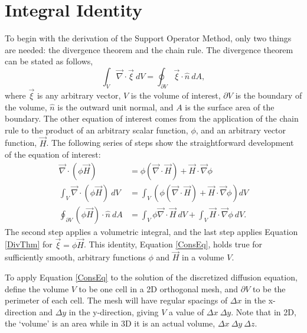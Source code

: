 \documentclass[11pt,letterpaper,oneside,notitlepage]{article}	%
\newcommand{\del}{\vec\nabla}				%
\newcommand{\eq}[1]{Equation \eqref{#1}}		%
\newcommand{\pindent}[1]{\hspace{6mm}}  		%
\numberwithin{equation}{section}				%
\begin{document}
\section{Integral Identity}%
\pindent{}To begin with the derivation of the Support Operator Method, only two things are needed: the divergence theorem and the chain rule.  The divergence theorem can be stated as follows,
\begin{equation}
\int_V \del\cdot\vec\xi\ dV = \oint_{\partial V} \vec \xi \cdot \hat n\ dA \label{DivThm},
\end{equation}
where $\vec \xi$ is any arbitrary vector, $V$ is the volume of interest, $\partial V$ is the boundary of the volume, $\hat n$ is the outward unit normal, and $A$ is the surface area of the boundary.  The other equation of interest comes from the application of the chain rule to the product of an arbitrary scalar function, $\phi$, and an arbitrary vector function, $\vec H$.  The following series of steps show the straightforward development of the equation of interest:
\begin{align}
\del\cdot(\phi\vec H) &= \phi(\del\cdot\vec H) + \vec H\cdot\del\phi \\
\int_V\del\cdot(\phi\vec H)\ dV &= \int_V\left(\phi(\del\cdot\vec H) + \vec H\cdot\del\phi\right)dV \\
\oint_{\partial V}(\phi\vec H)\cdot\hat n\ dA &= \int_V\phi\del\cdot\vec H\ dV + \int_V\vec H\cdot\del\phi\ dV \label{ConsEq}.
\end{align}
The second step applies a volumetric integral, and the last step applies \eq{DivThm} for $\vec\xi=\phi\vec H$.  This identity, \eq{ConsEq}, holds true for sufficiently smooth, arbitrary functions $\phi$ and $\vec H$ in a volume $V$\cite{Runnels2006}.

To apply \eq{ConsEq} to the solution of the discretized diffusion equation, define the volume $V$ to be one cell in a 2D orthogonal mesh, and $\partial V$ to be the perimeter of each cell.  The mesh will have regular spacings of $\Delta x$ in the x-direction and $\Delta y$ in the y-direction, giving $V$ a value of $\Delta x\ \Delta y$.  Note that in 2D, the `volume' is an area while in 3D it is an actual volume, $\Delta x\ \Delta y\ \Delta z$.
\end{document}
